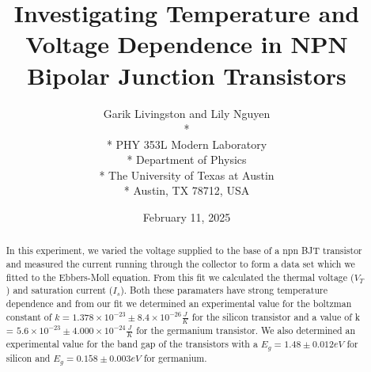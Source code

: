 \documentclass[12pt,letterpaper,twocolumn]{article}
\begin{document}

\title{Investigating Temperature and Voltage Dependence in NPN Bipolar Junction Transistors}

\author{
 Garik Livingston and Lily Nguyen \\*
  \\*
 PHY 353L Modern Laboratory \\*
 Department of Physics \\*
 The University of Texas at Austin \\*
 Austin, TX 78712, USA
}
\date{February 11, 2025}


\maketitle


\begin{abstract}
	In this experiment, we varied the voltage supplied to the base of a npn BJT transistor and measured the current running through the collector to form a data set which we fitted to the Ebbers-Moll equation.
	From this fit we calculated the thermal voltage ($V_T$) and saturation current ($I_s$). Both these paramaters have strong temperature dependence and from our fit we determined an experimental value for the boltzman constant of $k = 1.378 \times 10^{-23} \pm 8.4 \times 10^{-26} \frac{J}{K}$ for the silicon transistor and a value of k = $5.6 \times 10^{-23}\pm 4.000 \times 10^{-24} \frac{J}{K}$ for the germanium transistor. 
	We also determined an experimental value for the band gap of the transistors with a $E_g = 1.48 \pm 0.012eV$ for silicon and  $E_g = 0.158 \pm 0.003 eV$ for germanium.
	
\end{abstract}

\end{document}
